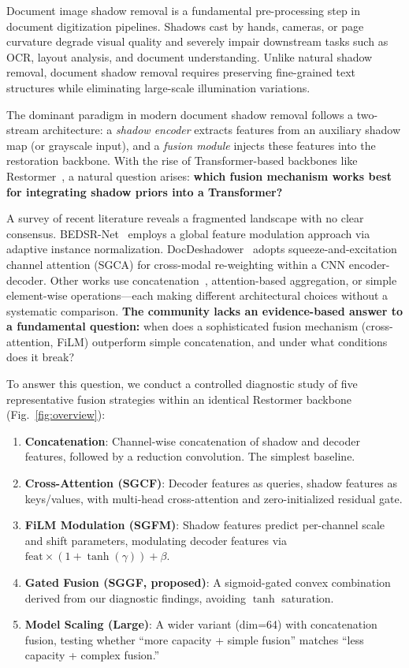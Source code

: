 \documentclass[11pt]{article}
\begin{document}
Document image shadow removal is a fundamental pre-processing step in document digitization pipelines.
Shadows cast by hands, cameras, or page curvature degrade visual quality and severely impair downstream tasks such as OCR, layout analysis, and document understanding.
Unlike natural shadow removal, document shadow removal requires preserving fine-grained text structures while eliminating large-scale illumination variations.

The dominant paradigm in modern document shadow removal follows a two-stream architecture: a \textit{shadow encoder} extracts features from an auxiliary shadow map (or grayscale input), and a \textit{fusion module} injects these features into the restoration backbone.
With the rise of Transformer-based backbones like Restormer~\cite{zamir2022restormer}, a natural question arises: \textbf{which fusion mechanism works best for integrating shadow priors into a Transformer?}

A survey of recent literature reveals a fragmented landscape with no clear consensus.
BEDSR-Net~\cite{lin2020document} employs a global feature modulation approach via adaptive instance normalization.
DocDeshadower~\cite{li2023single} adopts squeeze-and-excitation channel attention (SGCA) for cross-modal re-weighting within a CNN encoder-decoder.
Other works use concatenation~\cite{Liuspectral}, attention-based aggregation, or simple element-wise operations---each making different architectural choices without a systematic comparison.
\textbf{The community lacks an evidence-based answer to a fundamental question:} when does a sophisticated fusion mechanism (cross-attention, FiLM) outperform simple concatenation, and under what conditions does it break?

To answer this question, we conduct a controlled diagnostic study of five representative fusion strategies within an identical Restormer backbone (Fig.~\ref{fig:overview}):

\begin{enumerate}
  \item \textbf{Concatenation}: Channel-wise concatenation of shadow and decoder features, followed by a reduction convolution. The simplest baseline.
  \item \textbf{Cross-Attention (SGCF)}: Decoder features as queries, shadow features as keys/values, with multi-head cross-attention and zero-initialized residual gate.
  \item \textbf{FiLM Modulation (SGFM)}: Shadow features predict per-channel scale and shift parameters, modulating decoder features via $\text{feat} \times (1 + \tanh(\gamma)) + \beta$.
  \item \textbf{Gated Fusion (SGGF, proposed)}: A sigmoid-gated convex combination derived from our diagnostic findings, avoiding $\tanh$ saturation.
  \item \textbf{Model Scaling (Large)}: A wider variant (dim=64) with concatenation fusion, testing whether ``more capacity + simple fusion'' matches ``less capacity + complex fusion.''
\end{enumerate}
\end{document}
